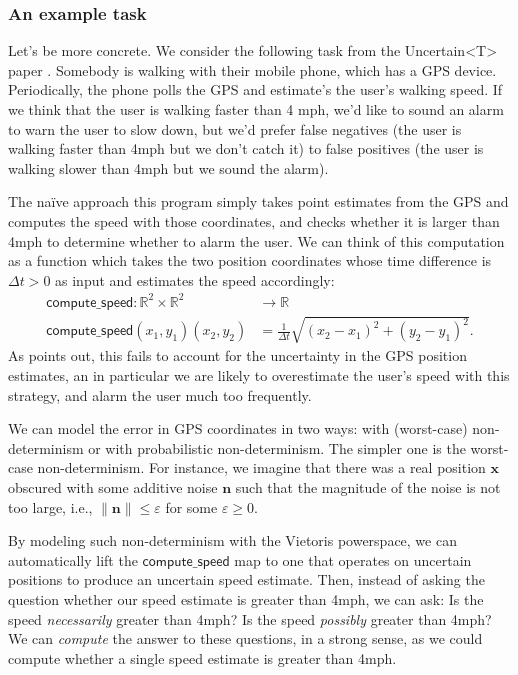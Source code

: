 \documentclass{article}           %
\newcommand{\R}{\mathbb{R}}
\newcommand{\ve}[1]{\mathbf{#1}}
\begin{document}
\subsubsection{An example task}

Let's be more concrete. We consider the following task from the Uncertain<T> paper \cite{uncertaint}. Somebody is walking with their mobile phone, which has a GPS device. Periodically, the phone polls the GPS and estimate's the user's walking speed. If we think that the user is walking faster than 4 mph, we'd like to sound an alarm to warn the user to slow down, but we'd prefer false negatives (the user is walking faster than 4mph but we don't catch it) to false positives (the user is walking slower than 4mph but we sound the alarm).

The naïve approach this program simply takes point estimates from the GPS and computes the speed with those coordinates, and checks whether it is larger than 4mph to determine whether to alarm the user. We can think of this computation as a function which takes the two position coordinates whose time difference is $\Delta t > 0$ as input and estimates the speed accordingly:
\begin{align*}
\mathsf{compute\_speed} : \R^2 \times \R^2 &\to \R
\\ \mathsf{compute\_speed} (x_1, y_1) (x_2, y_2) &= \frac{1}{\Delta t} \sqrt{(x_2 - x_1)^2 + (y_2 - y_1)^2}.
\end{align*}
As \cite{uncertaint} points out, this fails to account for the uncertainty in the GPS position estimates, an in particular we are likely to overestimate the user's speed with this strategy, and alarm the user much too frequently.

We can model the error in GPS coordinates in two ways: with (worst-case) non-determinism or with probabilistic non-determinism. The simpler one is the worst-case non-determinism. For instance, we imagine that there was a real position $\ve{x}$ obscured with some additive noise $\ve{n}$ such that the magnitude of the noise is not too large, i.e., $\| \ve{n} \| \le \varepsilon$ for some $\varepsilon \ge 0$.

By modeling such non-determinism with the Vietoris powerspace, we can automatically lift the $\mathsf{compute\_speed}$ map to one that operates on uncertain positions to produce an uncertain speed estimate. Then, instead of asking the question whether our speed estimate is greater than 4mph, we can ask: Is the speed \emph{necessarily} greater than 4mph? Is the speed \emph{possibly} greater than 4mph? We can \emph{compute} the answer to these questions, in a strong sense, as we could compute whether a single speed estimate is greater than 4mph.
\end{document}
